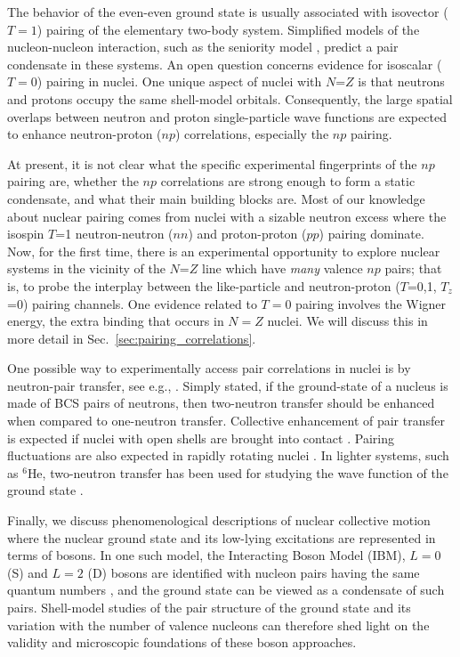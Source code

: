 \documentclass[rmp,aps,floatfix]{revtex4}
\begin{document}
The behavior of the even-even ground state is usually associated with
isovector ($T=1$) pairing of the elementary two-body system. Simplified
models of the nucleon-nucleon interaction, 
such as the seniority model \cite{talmi93}, 
predict a pair condensate in these systems. 
An open question concerns
evidence for isoscalar ($T=0$) pairing in nuclei. 
One unique aspect of 
nuclei with  $N$=$Z$ is that neutrons and protons occupy the same
shell-model orbitals. Consequently, 
the large spatial overlaps between neutron
and proton single-particle wave functions are expected to
enhance neutron-proton ($np$) correlations,  especially the $np$
pairing.  

At present, it is not clear what the specific experimental
fingerprints of the $np$ pairing are, whether the 
$np$ correlations
are strong enough to form
a static condensate, and what their 
main building blocks are. 
Most of our knowledge about nuclear pairing 
comes from nuclei with a  sizable neutron excess where
the isospin $T$=1 neutron-neutron ($nn$) and proton-proton 
($pp$) pairing  dominate. Now, for the first time,
there is an experimental opportunity to explore
nuclear  systems in the
vicinity of the $N$=$Z$ line which have
 {\em many} valence $np$ pairs;
that is,  to probe the interplay between the like-particle and
neutron-proton ($T$=0,1, $T_z$=0) pairing channels.
One evidence related to $T=0$ pairing
involves the Wigner energy, the extra binding that occurs in
$N=Z$ nuclei. We will discuss this in more detail in 
Sec.~\ref{sec:pairing_correlations}.

One possible way to experimentally access pair correlations
in nuclei is by neutron-pair transfer, see e.g., \cite{yoshida1962}. 
Simply stated, if the ground-state of a nucleus is made of  
BCS pairs of neutrons, then two-neutron transfer should be 
enhanced when compared to one-neutron transfer. 
Collective enhancement
of pair transfer is expected if nuclei with open shells are brought
into contact \cite{peter99}. Pairing fluctuations are also expected in rapidly rotating nuclei \cite{shimizu89}.
In lighter systems, such as $^6$He, two-neutron
transfer has been used for studying the wave function of the 
ground state \cite{ogan99}.  

Finally, we discuss phenomenological descriptions 
of nuclear collective motion where 
the nuclear ground state and its low-lying excitations are represented in
 terms of bosons.
In one such model, the Interacting Boson Model
(IBM), $L=0$ (S) and $L=2$ (D) bosons are identified with
nucleon pairs having the same quantum numbers \cite{Arima},
and the ground state can be
viewed as a condensate of such pairs.  Shell-model studies of the pair
structure of the ground state and its variation with the number of valence
nucleons can therefore shed light on the validity and microscopic foundations
of these boson approaches.
\end{document}
